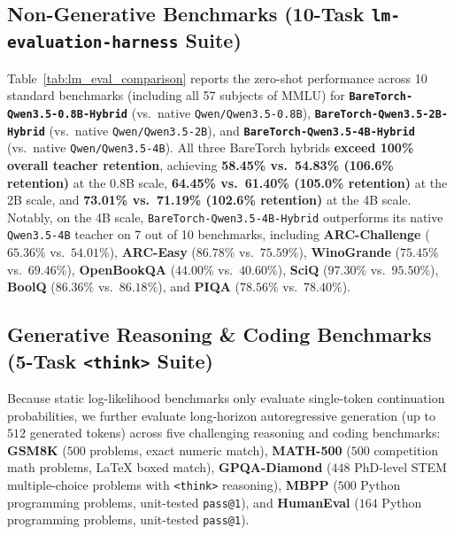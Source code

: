 \documentclass[twocolumn,10pt]{article}
\begin{document}
\subsection{Non-Generative Benchmarks (10-Task \texttt{lm-evaluation-harness} Suite)}
Table~\ref{tab:lm_eval_comparison} reports the zero-shot performance across 10 standard benchmarks (including all 57 subjects of MMLU) for \textbf{\texttt{BareTorch-Qwen3.5-0.8B-Hybrid}} (vs.\ native \texttt{Qwen/Qwen3.5-0.8B}), \textbf{\texttt{BareTorch-Qwen3.5-2B-Hybrid}} (vs.\ native \texttt{Qwen/Qwen3.5-2B}), and \textbf{\texttt{BareTorch-Qwen3.5-4B-Hybrid}} (vs.\ native \texttt{Qwen/Qwen3.5-4B}). All three BareTorch hybrids \textbf{exceed 100\% overall teacher retention}, achieving \textbf{58.45\% vs.\ 54.83\% (106.6\% retention)} at the 0.8B scale, \textbf{64.45\% vs.\ 61.40\% (105.0\% retention)} at the 2B scale, and \textbf{73.01\% vs.\ 71.19\% (102.6\% retention)} at the 4B scale. Notably, on the 4B scale, \texttt{BareTorch-Qwen3.5-4B-Hybrid} outperforms its native \texttt{Qwen3.5-4B} teacher on 7 out of 10 benchmarks, including \textbf{ARC-Challenge} ($65.36\%$ vs.\ $54.01\%$), \textbf{ARC-Easy} ($86.78\%$ vs.\ $75.59\%$), \textbf{WinoGrande} ($75.45\%$ vs.\ $69.46\%$), \textbf{OpenBookQA} ($44.00\%$ vs.\ $40.60\%$), \textbf{SciQ} ($97.30\%$ vs.\ $95.50\%$), \textbf{BoolQ} ($86.36\%$ vs.\ $86.18\%$), and \textbf{PIQA} ($78.56\%$ vs.\ $78.40\%$).

\subsection{Generative Reasoning \& Coding Benchmarks (5-Task \texttt{<think>} Suite)}
Because static log-likelihood benchmarks only evaluate single-token continuation probabilities, we further evaluate long-horizon autoregressive generation (up to $512$ generated tokens) across five challenging reasoning and coding benchmarks: \textbf{GSM8K} ($500$ problems, exact numeric match), \textbf{MATH-500} ($500$ competition math problems, LaTeX boxed match), \textbf{GPQA-Diamond} ($448$ PhD-level STEM multiple-choice problems with \texttt{<think>} reasoning), \textbf{MBPP} ($500$ Python programming problems, unit-tested \texttt{pass@1}), and \textbf{HumanEval} ($164$ Python programming problems, unit-tested \texttt{pass@1}).
\end{document}
